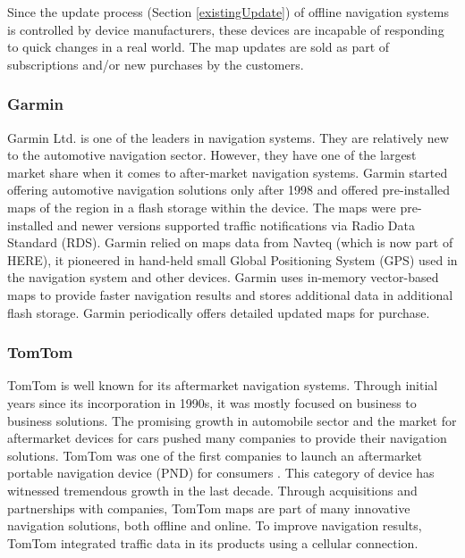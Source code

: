 Since the update process (Section \ref{existingUpdate}) of offline navigation systems is controlled by device manufacturers, these devices are incapable of responding to quick changes in a real world. The map updates are sold as part of subscriptions and/or new purchases by the customers.  
 
\subsubsection{Garmin}
Garmin Ltd. is one of the leaders in navigation systems. They are relatively new to the automotive navigation sector. However, they have one of the largest market share when it comes to after-market navigation systems. Garmin started offering automotive navigation solutions only after 1998 and offered pre-installed maps of the region in a flash storage within the device. The maps were pre-installed and newer versions supported traffic notifications via Radio Data Standard (RDS). Garmin relied on maps data from Navteq (which is now part of HERE), it pioneered in hand-held small Global Positioning System (GPS) used in the navigation system and other devices. Garmin uses in-memory vector-based maps to provide faster navigation results and stores additional data in additional flash storage. Garmin periodically offers detailed updated maps for purchase.
\subsubsection{TomTom}
TomTom is well known for its aftermarket navigation systems. Through initial years since its incorporation in 1990s, it was mostly focused on business to business solutions. The promising growth in automobile sector and the market for aftermarket devices for cars pushed many companies to provide their navigation solutions. TomTom was one of the first companies to launch an aftermarket portable navigation device (PND) for consumers \cite{tomtomhistory}. This category of device has witnessed tremendous growth in the last decade. Through acquisitions and partnerships with companies, TomTom maps are part of many innovative navigation solutions, both offline and online. To improve navigation results, TomTom integrated traffic data in its products using a cellular connection. 


